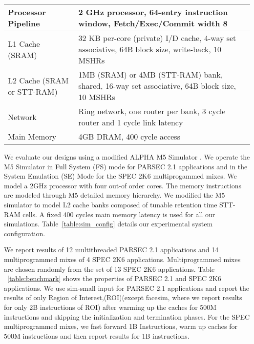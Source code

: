 \begin {table*} [t]
 \scriptsize
  \centering
 \caption {{Baseline processor, cache, memory and network configuration}} \label{table:sim_config}
 \begin{tabular}{|l|l|}
 \hline
Processor Pipeline & 2 GHz processor, 64-entry instruction window, Fetch/Exec/Commit width 8 \\
\hline
L1 Cache (SRAM) & 32 KB per-core (private) I/D cache, 4-way set associative, 64B block size, write-back, 10 MSHRs \\
\hline
L2 Cache (SRAM or STT-RAM) &  1MB (SRAM) or 4MB (STT-RAM) bank, shared, 16-way set associative, 64B block size, 10 MSHRs \\
\hline
Network & Ring network, one router per bank, 3 cycle router and 1 cycle link latency \\
\hline
Main Memory & 4GB DRAM, 400 cycle access \\
\hline
\end{tabular}
\end{table*}

We evaluate our designs using a modified ALPHA M5 Simulator \cite{M5} .
We operate the M5 Simulator in Full System (FS) mode for PARSEC 2.1 applications and in the System Emulation (SE) Mode
for the SPEC 2K6 multiprogammed mixes. We model a 2GHz processor with four out-of order cores.
The memory instructions are modeled through M5 detailed memory hierarchy. We modified the M5 simulator to model
L2 cache banks composed of tunable retention time STT-RAM cells. A fixed 400 cycles main memory latency is used for all our simulations. Table~\ref{table:sim_config} details our experimental system configuration.

We report results of 12 multithreaded PARSEC 2.1 applications and 14 multiprogrammed mixes of 4 SPEC 2K6 applications.
Multiprogrammed mixes are chosen randomly from the set of 13 SPEC 2K6 applications.
Table ~\ref{table:benchmark} shows the properties of PARSEC 2.1 and SPEC 2K6 applications.
We use sim-small input for PARSEC 2.1 applications and report the results of only Region of Interest,(ROI)(except facesim, where we report results for only 2B instructions of ROI)
after warming up the caches for 500M instructions and skipping the initialization and termination phases. For the SPEC multiprogrammed mixes,
we fast forward 1B Instructions, warm up caches for 500M instructions and then report
results for 1B instructions.

